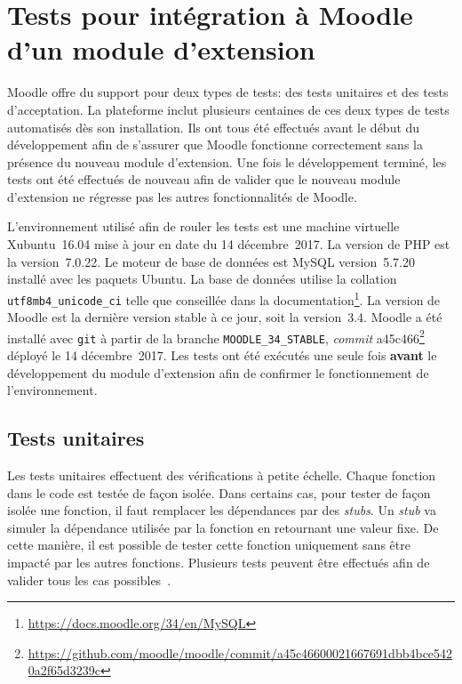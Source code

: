 \chapter{Tests pour int\'egration \`a Moodle d'un module d'extension}
Moodle offre du support pour deux types de tests: des tests unitaires et des tests d'acceptation.
La plateforme inclut plusieurs centaines de ces deux types de tests automatis\'es d\`es son installation.
Ils ont tous \'et\'e effectu\'es avant le d\'ebut du d\'eveloppement afin de s'assurer que Moodle fonctionne correctement sans la pr\'esence du nouveau module d'extension.
Une fois le d\'eveloppement termin\'e, les tests ont \'et\'e effectu\'es de nouveau afin de valider que le nouveau module d'extension ne r\'egresse pas les autres fonctionnalit\'es de Moodle.

L'environnement utilis\'e afin de rouler les tests est une machine virtuelle Xubuntu~16.04 mise \`a jour en date du 14 d\'ecembre~2017.
La version de PHP est la version~7.0.22.
Le moteur de base de donn\'ees est MySQL version~5.7.20 install\'e avec les paquets Ubuntu.
La base de donn\'ees utilise la collation \texttt{utf8mb4\_unicode\_ci} telle que conseill\'ee dans la documentation\footnote{\url{https://docs.moodle.org/34/en/MySQL}}.
La version de Moodle est la derni\`ere version stable \`a ce jour, soit la version~3.4.
Moodle a \'et\'e install\'e avec \texttt{git} \`a partir de la branche \texttt{MOODLE\_34\_STABLE}, \textit{commit} a45c466\footnote{\url{https://github.com/moodle/moodle/commit/a45c46600021667691dbb4bce5420a2f65d3239c}} d\'eploy\'e le 14 d\'ecembre~2017.
Les tests ont \'et\'e ex\'ecut\'es une seule fois \textbf{avant} le d\'eveloppement du module d'extension afin de confirmer le fonctionnement de l'environnement.

\section{Tests unitaires}
\label{test-unitaires}
Les tests unitaires effectuent des v\'erifications \`a petite \'echelle.
Chaque fonction dans le code est test\'ee de fa\c{c}on isol\'ee.
Dans certains cas, pour tester de fa\c{c}on isol\'ee une fonction, il faut remplacer les d\'ependances par des \textit{stubs}.
Un \textit{stub} va simuler la d\'ependance utilis\'ee par la fonction en retournant une valeur fixe.
De cette mani\`ere, il est possible de tester cette fonction uniquement sans \^etre impact\'e par les autres fonctions.
Plusieurs tests peuvent \^etre effectu\'es afin de valider tous les cas possibles~\cite{tremblay16}.

